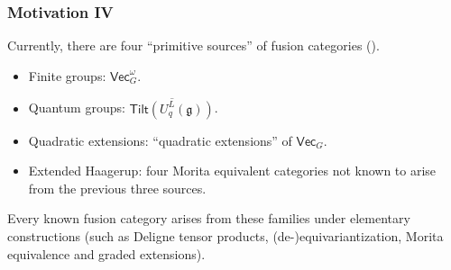 \documentclass{beamer}
\newcommand{\textcat}[1]{\mathrm{\textsf{#1}}}
\begin{document}
\begin{frame}
\frametitle{Motivation IV}
Currently, there are four ``primitive sources'' of fusion categories (\cite{EIP24}).\pause\\[1.5ex]
\begin{itemize}[<+->]
\item \textcolor{structure}{Finite groups}: $\textcat{Vec}_G^\omega$.%
\item \textcolor{structure}{Quantum groups}: %
$\overline{\textcat{Tilt}(U_q^L(\mathfrak{g}))}$.%
\item \textcolor{structure}{Quadratic extensions}: ``quadratic extensions'' of $\textcat{Vec}_G$.%
\item \textcolor{structure}{Extended Haagerup}: four Morita equivalent categories not known to arise from the previous three sources.\\[2ex]
\end{itemize}\pause[\thebeamerpauses]
Every \textcolor{structure}{known} fusion category arises from these families under elementary constructions (such as Deligne tensor products, (de-)equivariantization, Morita equivalence and graded extensions).
\end{frame}




\end{document}
